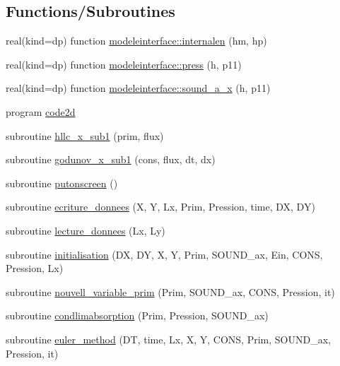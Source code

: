 \subsection*{Functions/\+Subroutines}
\begin{DoxyCompactItemize}
\item 
real(kind=dp) function \mbox{\hyperlink{namespacemodeleinterface_a6b953eda7a6bc3e81e6ae451b273b548}{modeleinterface\+::internalen}} (hm, hp)
\item 
real(kind=dp) function \mbox{\hyperlink{namespacemodeleinterface_ad34088de8c0162343994153e8f34921e}{modeleinterface\+::press}} (h, p11)
\item 
real(kind=dp) function \mbox{\hyperlink{namespacemodeleinterface_a1505c575aa44b45a8509fe827f28bc8d}{modeleinterface\+::sound\+\_\+a\+\_\+x}} (h, p11)
\item 
program \mbox{\hyperlink{mainSW_8f90_a8712173bc20143ca5b1b8cbd782b563e}{code2d}}
\item 
subroutine \mbox{\hyperlink{mainSW_8f90_ad651365c868e762b033239f23065b179}{hllc\+\_\+x\+\_\+sub1}} (prim, flux)
\item 
subroutine \mbox{\hyperlink{mainSW_8f90_aec66a1d113ade1d60ad864482ea8e4cf}{godunov\+\_\+x\+\_\+sub1}} (cons, flux, dt, dx)
\item 
subroutine \mbox{\hyperlink{mainSW_8f90_a8a5b072c001df1496416cc96562c9916}{putonscreen}} ()
\item 
subroutine \mbox{\hyperlink{mainSW_8f90_a71aecccc646b5e5547884fff4f3a4320}{ecriture\+\_\+donnees}} (X, Y, Lx, Prim, Pression, time, DX, DY)
\item 
subroutine \mbox{\hyperlink{mainSW_8f90_a7e06ba833aef7743b6a2f1be79f4bc2e}{lecture\+\_\+donnees}} (Lx, Ly)
\item 
subroutine \mbox{\hyperlink{mainSW_8f90_a58ba3803323d27b63b474b0d71dd80cd}{initialisation}} (DX, DY, X, Y, Prim, S\+O\+U\+N\+D\+\_\+ax, Ein, C\+O\+NS, Pression, Lx)
\item 
subroutine \mbox{\hyperlink{mainSW_8f90_a7645bf861c24416d7be2b579253bb6d4}{nouvell\+\_\+variable\+\_\+prim}} (Prim, S\+O\+U\+N\+D\+\_\+ax, C\+O\+NS, Pression, it)
\item 
subroutine \mbox{\hyperlink{mainSW_8f90_a90165511d1e957b38e88d5aa8e349b60}{condlimabsorption}} (Prim, Pression, S\+O\+U\+N\+D\+\_\+ax)
\item 
subroutine \mbox{\hyperlink{mainSW_8f90_ac38992b213d7b23accbdf96615349ef0}{euler\+\_\+method}} (DT, time, Lx, X, Y, C\+O\+NS, Prim, S\+O\+U\+N\+D\+\_\+ax, Pression, it)
\end{DoxyCompactItemize}


